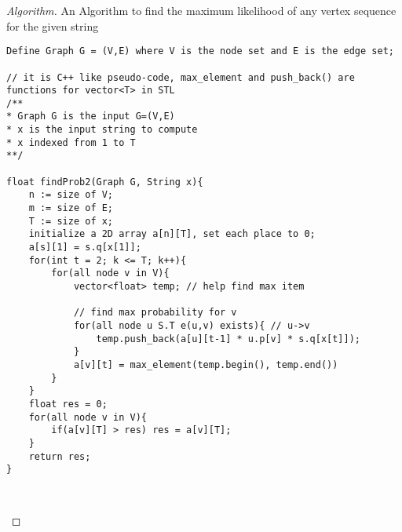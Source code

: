 \documentclass[openany]{article}
\begin{document}
\begin{proof}[Algorithm]{}
		\renewcommand{\qedsymbol}{}
		An Algorithm to find the maximum likelihood of any vertex sequence for the given string
		\begin{lstlisting}[basicstyle=\fontsize{8}{9}\selectfont\ttfamily]
Define Graph G = (V,E) where V is the node set and E is the edge set;

// it is C++ like pseudo-code, max_element and push_back() are functions for vector<T> in STL
/**
* Graph G is the input G=(V,E)
* x is the input string to compute
* x indexed from 1 to T
**/

float findProb2(Graph G, String x){
    n := size of V;
    m := size of E;
    T := size of x;
    initialize a 2D array a[n][T], set each place to 0;
    a[s][1] = s.q[x[1]];
    for(int t = 2; k <= T; k++){
        for(all node v in V){
            vector<float> temp; // help find max item
            
            // find max probability for v
            for(all node u S.T e(u,v) exists){ // u->v
                temp.push_back(a[u][t-1] * u.p[v] * s.q[x[t]]);
            }
            a[v][t] = max_element(temp.begin(), temp.end())
        }
    }
    float res = 0;
    for(all node v in V){
        if(a[v][T] > res) res = a[v][T];
    }
    return res;
}

        
		\end{lstlisting} 
\end{proof}
\end{document}
